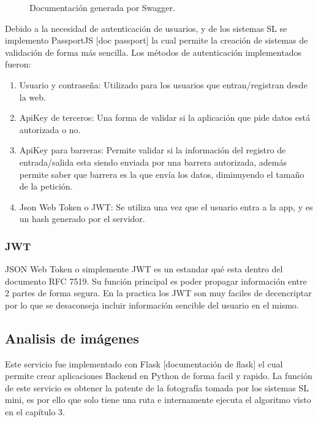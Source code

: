 \begin{figure}
    \centering

    \caption{Documentación generada por Swagger.}
    \label{fig:swagger-example}
\end{figure}

Debido a la necesidad de autenticación de usuarios, y de los sistemas SL se implemento PassportJS [doc passport] la cual permite la creación de sistemas de validación de forma más sencilla. Los métodos de autenticación implementados fueron:

\begin{enumerate}
    \item Usuario y contraseña: Utilizado para los usuarios que entran/registran desde la web.
    \item ApiKey de terceros: Una forma de validar si la aplicación que pide datos está autorizada o no.
    \item ApiKey para barreras: Permite validar si la información del registro de entrada/salida esta siendo enviada por una barrera autorizada, además permite saber que barrera es la que envía los datos, diminuyendo el tamaño de la petición.
    \item Json Web Token o JWT: Se utiliza una vez que el usuario entra a la app, y es un hash generado por el servidor.
\end{enumerate}

\subsubsection*{JWT}

JSON Web Token o simplemente JWT es un estandar qué esta dentro del documento RFC 7519. Su función principal es poder propagar información entre 2 partes de forma segura. En la practica los JWT son muy faciles de decencriptar por lo que se desaconseja incluir información sencible del usuario en el mismo.

\subsection{Analisis de imágenes}

Este servicio fue implementado con Flask [documentación de flask] el cual permite crear aplicaciones Backend en Python de forma facil y rapido. La función de este servicio es obtener la patente de la fotografía tomada por los sistemas SL mini, es por ello que solo tiene una ruta e internamente ejecuta el algoritmo visto en el capítulo 3.

